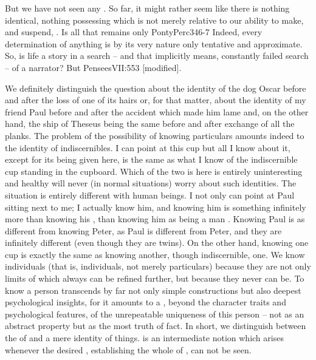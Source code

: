 
But we have not seen any . So far, it might rather seem like there is
nothing  identical, nothing possessing  which is
not merely relative to our ability to make, and suspend, .  Is
all that remains only \citet{a permanently tentative look?}{PontyPerc}{346-7}
Indeed, every  determination of anything  is by its
very nature only tentative and approximate. So, is life a story in a search --
and that implicitly means, constantly failed search -- of a
narrator? But \citet{thou wouldst not seek, if
  thou hadst not found.}{Pensees}{VII:553 [modified]}.

We definitely distinguish the question about the identity of the dog Oscar
before and after the loss of one of its hairs or, for that matter, about the
identity of my friend Paul before and after the accident which made him lame
and, on the other hand, the ship of Theseus being the same before and after
exchange of all the planks.  The problem of the possibility of knowing
particulars amounts indeed to the identity of indiscernibles. I can point at
this cup but all I know about it, except for its being  given here,
is the same as what I know of the indiscernible cup standing in the cupboard.
Which of the two is here is entirely uninteresting and healthy 
will never (in normal situations) worry about such identities. The situation is
entirely different with human beings. I not only can point at Paul sitting next
to me; I actually know him, and knowing him is something infinitely more than
knowing his , than knowing him as being a man
. Knowing Paul is as different from knowing Peter, as Paul is
different from Peter, and they are infinitely different (even though they are
twins). On the other hand, knowing one cup is exactly the same as knowing
another, though indiscernible, one.  We know individuals (that is, 
individuals, not merely particulars) because they are not only limits of
 which always can be refined further, but because they never
can be. To know a person transcends by far not only simple 
constructions but also deepest psychological insights, for it amounts to a
, beyond the character traits and psychological features, of the
unrepeatable uniqueness of this person -- not as an abstract property but as the
most  truth of fact.  In short, we distinguish between the
 of  and a mere identity of  things.
 is an intermediate notion which arises whenever the desired
, establishing the whole of , can not be
seen.

